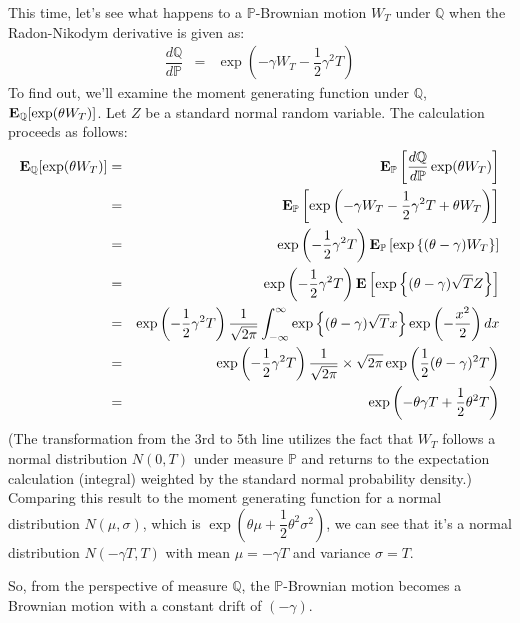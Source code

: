 \documentclass[uplatex,a4j,12pt,dvipdfmx]{jsarticle}
\begin{document}
This time, let's see what happens to a $\mathbb{P}$-Brownian motion $W_{T}$ under $\mathbb{Q}$ when the Radon-Nikodym derivative is given as:
%
\begin{eqnarray*}
	\dfrac{ d \mathbb{Q} }{ d \mathbb{P} }
	&=&
	\exp \left( - \gamma W_{T} - \dfrac{1}{2} \gamma^{2} T \right)
\end{eqnarray*}
%
To find out, we'll examine the moment generating function under $\mathbb{Q}$, ${\bf E}_{\mathbb{Q}}[ \exp( \theta W_{T} ) ]$. Let $Z$ be a standard normal random variable. The calculation proceeds as follows:
%
\begin{eqnarray*}
	{\bf E}_{\mathbb{Q}}[ \exp( \theta W_{T} ) ]
	&=&
	{\bf E}_{\mathbb{P}} \left[ \dfrac{ d \mathbb{Q} }{ d \mathbb{P} } \exp( \theta W_{T} ) \right]
	\\ &=&
	{\bf E}_{\mathbb{P}} \left[ \exp \left( - \gamma W_{T} - \dfrac{1}{2} \gamma^{2} T + \theta W_{T} \right) \right]
	\\ &=&
	\exp \left( - \dfrac{1}{2} \gamma^{2} T \right)
	{\bf E}_{\mathbb{P}} \left[ \exp \left\{ ( \theta - \gamma ) W_{T} \right\} \right]
	\\ &=&
	\exp \left( - \dfrac{1}{2} \gamma^{2} T \right)
	{\bf E} \left[ \exp \left\{ ( \theta - \gamma ) \sqrt{T} Z \right\} \right]
	\\ &=&
	\exp \left( - \dfrac{1}{2} \gamma^{2} T \right)
	\dfrac{1}{\sqrt{2 \pi}}
	\int^{\infty}_{-\infty}
	\exp \left\{ ( \theta - \gamma ) \sqrt{T} x \right\} \exp \left( -\dfrac{x^{2}}{2} \right) dx
	\\ &=&
	\exp \left( - \dfrac{1}{2} \gamma^{2} T \right)
	\dfrac{1}{\sqrt{2 \pi}}
	\times \sqrt{ 2 \pi }
	\exp \left( \dfrac{1}{2} (\theta - \gamma)^{2} T \right)
	\\ &=&
	\exp \left( - \theta \gamma T + \dfrac{1}{2} \theta^{2} T \right)
\end{eqnarray*}
%
(The transformation from the 3rd to 5th line utilizes the fact that $W_{T}$ follows a normal distribution $N(0,T)$ under measure $\mathbb{P}$ and returns to the expectation calculation (integral) weighted by the standard normal probability density.)
Comparing this result to the moment generating function for a normal distribution $N(\mu,\sigma)$, which is $\exp( \theta \mu + \dfrac{1}{2} \theta^{2} \sigma^{2} )$, we can see that it's a normal distribution $N(- \gamma T,T)$ with mean $\mu = - \gamma T$ and variance $\sigma = T$.

So, from the perspective of measure $\mathbb{Q}$, the $\mathbb{P}$-Brownian motion becomes a Brownian motion with a constant drift of $(-\gamma)$.
\end{document}
